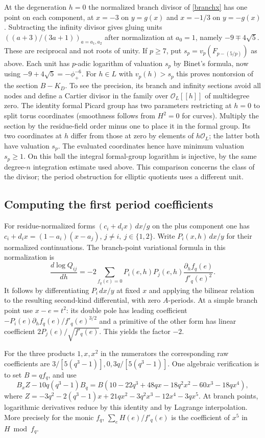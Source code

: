 \documentclass[11pt]{article}
\begin{document}
At the degeneration $h=0$ the normalized branch divisor of
\eqref{branchx} has one point on each component, at $x=-3$ on $y=g(x)$
and $x=-1/3$ on $y=-g(x)$. Subtracting the infinity divisor gives
gluing units $((a+3)/(3a+1))_{a=a_1,a_2}$ after normalization at
$a_0=1$, namely $-9\mp4\sqrt5$. These are reciprocal and not roots of
unity. If $p\ge7$, put $s_p=v_p(F_{p-(5/p)})$ as above. Each unit has
$p$-adic logarithm of valuation $s_p$ by Binet's formula, now using
$-9+4\sqrt5=-\phi_+^{-6}$. For $h\in L$ with $v_p(h)>s_p$ this proves
nontorsion of the section $B-K_D$. To see the precision, its branch
and infinity sections avoid all nodes and define a Cartier divisor
in the family over $\mathcal O_L[[h]]$ of multidegree zero. The
identity formal Picard group has two parameters restricting at $h=0$
to split torus coordinates (smoothness follows from $H^2=0$ for
curves). Multiply the section by the residue-field order minus one
to place it in the formal group. Its two coordinates at $h$ differ
from those at zero by elements of $h\mathcal O_L$; the latter both have
valuation $s_p$. The evaluated coordinates hence have minimum valuation
$s_p\ge1$. On this ball the integral formal-group logarithm is injective,
by the same degree-$n$ integration estimate used above. This comparison
concerns the class of the divisor; the period obstruction for elliptic
quotients uses a different unit.


\subsection{Computing the first period coefficients}
For residue-normalized forms $(c_i+d_ix)\,dx/g$ on the plus component
one has $c_i+d_ix=(1-a_i)(x-a_j)$, $j\ne i,\ j\in\{1,2\}$.
Write $P_i(x,h)\,dx/y$ for their normalized continuations.
The branch-point variational formula in this normalization is
\[
 \frac{d\log Q_{ij}}{dh}
 =-2\sum_{f_q(e)=0}P_i(e,h)P_j(e,h)\frac{\partial_h f_q(e)}{f'_q(e)^2}.
\]
It follows by differentiating $P_i\,dx/y$ at fixed $x$ and applying
the bilinear relation to the resulting second-kind differential, with
zero $A$-periods. At a simple branch point use $x-e=t^2$: its double
pole has leading coefficient $-P_i(e)\partial_h f_q(e)/f'_q(e)^{3/2}$
and a primitive of the other form has linear coefficient
$2P_j(e)/\sqrt{f'_q(e)}$. This yields the factor $-2$.

For the three products $1,x,x^2$ in the numerators the corresponding
raw coefficients are $3/[5(q^3-1)],0,3q/[5(q^3-1)]$.
One algebraic verification is to set $B=qf_q$, and use
\[
 B_xZ-10q(q^3-1)B_q=
 B(10-22q^3+48qx-18q^2x^2-60x^3-18qx^4),
\]
where $Z=-3q^2-2(q^3-1)x+21qx^2-3q^2x^3-12x^4-3qx^5$.
At branch points, logarithmic derivatives reduce by this identity
and by Lagrange interpolation. More precisely for the monic $f_q$,
$\sum_e H(e)/f'_q(e)$ is the coefficient of $x^5$ in $H\bmod f_q$.
\end{document}
